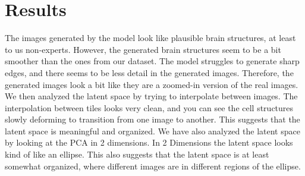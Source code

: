 \documentclass[12pt]{article}
\begin{document}
\section{Results}
	The images generated by the model look like plausible brain structures, at least to us non-experts. However, the generated brain structures seem to be a bit smoother than the ones from our dataset. The model struggles to generate sharp edges, and there seems to be less detail in the generated images. Therefore, the generated images look a bit like they are a zoomed-in version of the real images. We then analyzed the latent space by trying to interpolate between images. The interpolation between tiles looks very clean, and you can see the cell structures slowly deforming to transition from one image to another. This suggests that the latent space is meaningful and organized. We have also analyzed the latent space by looking at the PCA in 2 dimensions. In 2 Dimensions the latent space looks kind of like an ellipse. This also suggests that the latent space is at least somewhat organized, where different images are in different regions of the ellipse.

\end{document}

